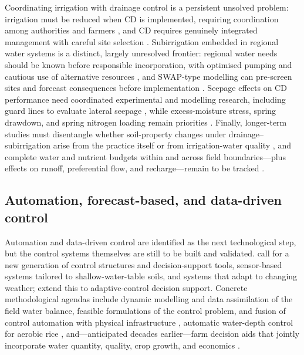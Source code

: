 Coordinating irrigation with drainage control is a persistent unsolved problem:
irrigation must be reduced when CD is implemented, requiring coordination among
authorities and farmers \parencite{Wahba2005,Ritzema2011,Ritzema2016}, and CD
requires genuinely integrated management with careful site selection
\parencite{Dukhovny2018}. Subirrigation embedded in regional water systems is a
distinct, largely unresolved frontier: regional water needs should be known
before responsible incorporation, with optimised pumping and cautious use of
alternative resources \parencite{deWit2022}, and SWAP-type modelling can
pre-screen sites and forecast consequences before implementation
\parencite{deWit2024}. Seepage effects on CD performance need coordinated
experimental and modelling research, including guard lines to evaluate lateral
seepage \parencite{Youssef2021,Pease2017,Ale2009}, while excess-moisture stress,
spring drawdown, and spring nitrogen loading remain priorities
\parencite{Craft2018,Lahdou2019}. Finally, longer-term studies must disentangle
whether soil-property changes under drainage--subirrigation arise from the
practice itself or from irrigation-water quality \parencite{Kaur2023}, and
complete water and nutrient budgets within and across field boundaries---plus
effects on runoff, preferential flow, and recharge---remain to be tracked
\parencite{Shedekar2021,Ross2016,King2022}.

\subsection{Automation, forecast-based, and data-driven control}

Automation and data-driven control are identified as the next technological
step, but the control systems themselves are still to be built and validated.
\textcite{Youssef2023} call for a new generation of control structures and
decision-support tools, sensor-based systems tailored to shallow-water-table
soils, and systems that adapt to changing weather; \textcite{Ayars2015} extend
this to adaptive-control decision support. Concrete methodological agendas
include dynamic modelling and data assimilation of the field water balance,
feasible formulations of the control problem, and fusion of control automation
with physical infrastructure \parencite{Ikonen2023,Isomäki2024}, automatic
water-depth control for aerobic rice \parencite{Arif2021}, and---anticipated
decades earlier---farm decision aids that jointly incorporate water quantity,
quality, crop growth, and economics \parencite{THOMAS1995}.

